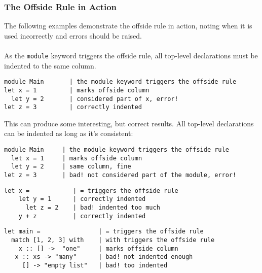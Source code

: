\documentclass{article}
\begin{document}
\subsubsection*{The Offside Rule in Action}
The following examples demonstrate the offside rule in action, noting when it is used incorrectly and errors should be raised.\\
\\
As the \verb|module| keyword triggers the offside rule, all top-level declarations must be indented to the same column.
\begin{verbatim}
module Main       | the module keyword triggers the offside rule
let x = 1         | marks offside column
  let y = 2       | considered part of x, error!
let z = 3         | correctly indented
\end{verbatim}
This can produce some interesting, but correct results. All top-level declarations can be indented as long as it's consistent: 
\begin{verbatim}
module Main     | the module keyword triggers the offside rule
  let x = 1     | marks offside column
  let y = 2     | same column, fine 
let z = 3       | bad! not considered part of the module, error!
\end{verbatim}

\begin{verbatim}
let x =            | = triggers the offside rule
    let y = 1      | correctly indented
      let z = 2    | bad! indented too much
    y + z          | correctly indented
\end{verbatim}

\begin{verbatim}
let main =                | = triggers the offside rule
  match [1, 2, 3] with    | with triggers the offside rule
    x :: [] ->  "one"     | marks offside column
   x :: xs -> "many"      | bad! not indented enough
     [] -> "empty list"   | bad! too indented
\end{verbatim}
\end{document}
